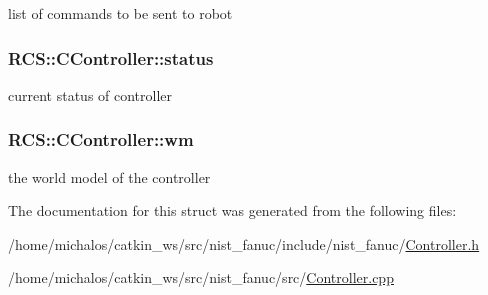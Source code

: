 list of commands to be sent to robot \hypertarget{structRCS_1_1CController_a82e9cc233cd25554964efe8a9008e0b2}{
\subsubsection[{status}]{ R\-C\-S\-::\-C\-Controller\-::status\hspace{0.3cm}{\ttfamily [static]}}}\label{structRCS_1_1CController_a82e9cc233cd25554964efe8a9008e0b2}
current status of controller \hypertarget{structRCS_1_1CController_a2b5d355e3e9d6195943ab148c1f94083}{
\subsubsection[{wm}]{ R\-C\-S\-::\-C\-Controller\-::wm\hspace{0.3cm}{\ttfamily [static]}}}\label{structRCS_1_1CController_a2b5d355e3e9d6195943ab148c1f94083}
the world model of the controller 

The documentation for this struct was generated from the following files\-:\begin{DoxyCompactItemize}
\item 
/home/michalos/catkin\-\_\-ws/src/nist\-\_\-fanuc/include/nist\-\_\-fanuc/\hyperlink{Controller_8h}{Controller.\-h}\item 
/home/michalos/catkin\-\_\-ws/src/nist\-\_\-fanuc/src/\hyperlink{Controller_8cpp}{Controller.\-cpp}\end{DoxyCompactItemize}
